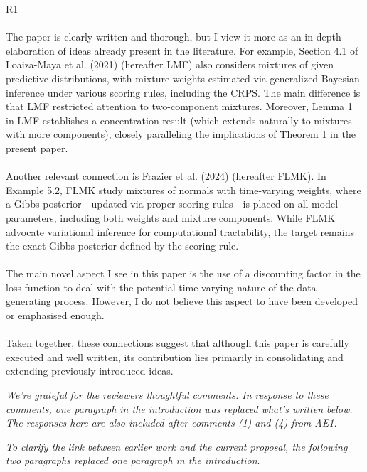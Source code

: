 \documentclass[ba]{imsart}
\newcommand{\1}[1]{\mathds{1}\left[#1\right]}
\begin{document}
\Huge
\noindent R1
\normalsize
\\~\\
The paper is clearly written and thorough, but I view it more as an in-depth 
elaboration of ideas 
already present in the literature. For example, Section 4.1 of Loaiza-Maya et 
al. (2021) (hereafter LMF) 
also considers mixtures of given predictive distributions, with mixture weights 
estimated via 
generalized Bayesian inference under various scoring rules, including the CRPS. 
The main difference is 
that LMF restricted attention to two-component mixtures. Moreover, Lemma 1 in 
LMF establishes a 
concentration result (which extends naturally to mixtures with more components), 
closely paralleling 
the implications of Theorem 1 in the present paper. 
\\~\\
Another relevant connection is Frazier et al. (2024) (hereafter FLMK). In 
Example 5.2, FLMK study 
mixtures of normals with time-varying weights, where a Gibbs posterior—updated 
via proper scoring 
rules—is placed on all model parameters, including both weights and mixture 
components. While 
FLMK advocate variational inference for computational tractability, the target 
remains the exact Gibbs 
posterior defined by the scoring rule.
\\~\\
The main novel aspect I see in this paper is the use of a discounting factor 
in the loss function to deal 
with the potential time varying nature of the data generating process. 
However, I do not believe this 
aspect to have been developed or emphasised enough.
\\~\\
Taken together, these connections suggest that although this paper is 
carefully executed and well 
written, its contribution lies primarily in consolidating and extending 
previously introduced ideas.

\emph{We're grateful for the reviewers thoughtful comments. 
In response to these comments, one paragraph in the 
introduction was replaced what's written below. 
The responses here are also included after comments (1) and (4) from AE1.}

\emph{To clarify the link between earlier work and the current proposal, 
the following two paragraphs replaced one paragraph in the introduction}.
\end{document}
